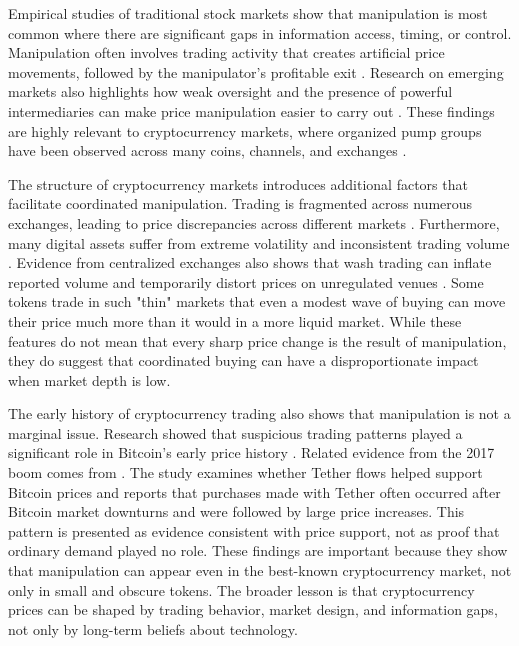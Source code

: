 Empirical studies of traditional stock markets show that manipulation is most common where there are significant gaps in information access, timing, or control. Manipulation often involves trading activity that creates artificial price movements, followed by the manipulator's profitable exit \cite{aggarwal2006stock}. Research on emerging markets also highlights how weak oversight and the presence of powerful intermediaries can make price manipulation easier to carry out \cite{khwaja2005unchecked}. These findings are highly relevant to cryptocurrency markets, where organized pump groups have been observed across many coins, channels, and exchanges \cite{kamps2018pump, hamrick2021examination}.

The structure of cryptocurrency markets introduces additional factors that facilitate coordinated manipulation. Trading is fragmented across numerous exchanges, leading to price discrepancies across different markets \cite{makarov2020trading}. Furthermore, many digital assets suffer from extreme volatility and inconsistent trading volume \cite{liu2021risks}. Evidence from centralized exchanges also shows that wash trading can inflate reported volume and temporarily distort prices on unregulated venues \cite{cong2023crypto}. Some tokens trade in such "thin" markets that even a modest wave of buying can move their price much more than it would in a more liquid market. While these features do not mean that every sharp price change is the result of manipulation, they do suggest that coordinated buying can have a disproportionate impact when market depth is low.

The early history of cryptocurrency trading also shows that manipulation is not a marginal issue. Research showed that suspicious trading patterns played a significant role in Bitcoin's early price history \cite{gandal2018price}. Related evidence from the 2017 boom comes from \cite{griffin2020untethered}. The study examines whether Tether flows helped support Bitcoin prices and reports that purchases made with Tether often occurred after Bitcoin market downturns and were followed by large price increases. This pattern is presented as evidence consistent with price support, not as proof that ordinary demand played no role. These findings are important because they show that manipulation can appear even in the best-known cryptocurrency market, not only in small and obscure tokens. The broader lesson is that cryptocurrency prices can be shaped by trading behavior, market design, and information gaps, not only by long-term beliefs about technology.

